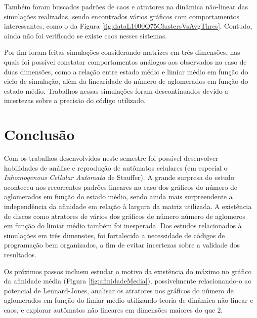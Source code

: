 \documentclass[11pt,a4paper,twocolumn,final]{article}
\begin{document}
Também foram buscados padrões de caos e atratores na dinâmica não-linear das simulações realizadas, sendo encontrados vários gráficos com comportamentos interessantes, como o da Figura \ref{fig:dataL1000Q75ClustersVsAvgThres}. Contudo, ainda não foi verificado se existe caos nesses sistemas.

Por fim foram feitas simulações considerando matrizes em três dimensões, nas quais foi possível constatar comportamentos análogos aos observados no caso de duas dimensões, como a relação entre estado médio e limiar médio em função do ciclo de simulação, além da linearidade do número de aglomerados em função do estado médio. Trabalhos nessas simulações foram descontinuados devido a incertezas sobre a precisão do código utilizado.

\section*{Conclusão}

Com os trabalhos desenvolvidos neste semestre foi possível desenvolver habilidades de análise e reprodução de autômatos celulares (em especial o \textit{Inhomogenous Cellular Automata} de Stauffer). A grande surpresa do estudo aconteceu nos recorrentes padrões lineares no caso dos gráficos do número de aglomerados em função do estado médio, sendo ainda mais surpreendente a independência da afinidade em relação à largura da matriz utilizada. A existência de discos como atratores de vários dos gráficos de número número de aglomeros em função do limiar médio também foi inesperada. Dos estudos relacionados à simulações em três dimensões, foi fortalecida a necessidade de códigos de programação bem organizados, a fim de evitar incertezas sobre a validade dos resultados.

Os próximos passos incluem estudar o motivo da existência do máximo no gráfico da afinidade média (Figura \ref{fig:afinidadeMedia}), possivelmente relacionando-o ao potencial de Lennard-Jones, analisar os atratores nos gráficos do número de aglomerados em função do limiar médio utilizando teoria de dinâmica não-linear e caos, e explorar autômatos não lineares em dimensões maiores do que 2.
\end{document}
